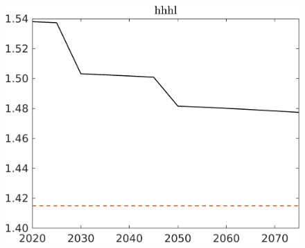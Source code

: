 \begin{figure}[h!!]
\begin{minipage}[]{0.32\textwidth}
	\end{minipage}
	\begin{minipage}[]{0.32\textwidth}
		\includegraphics[width=1\textwidth]{../../codding_model/own_basedOnFried/optimalPol_elastS_DisuSci/figures/all_1705/hhhl_BAUCompOPT_T_NoTaus_spillover0_sep1_BN0_ineq0_red0_etaa0.79_lgd0.png}
	\end{minipage}
\end{figure} 


